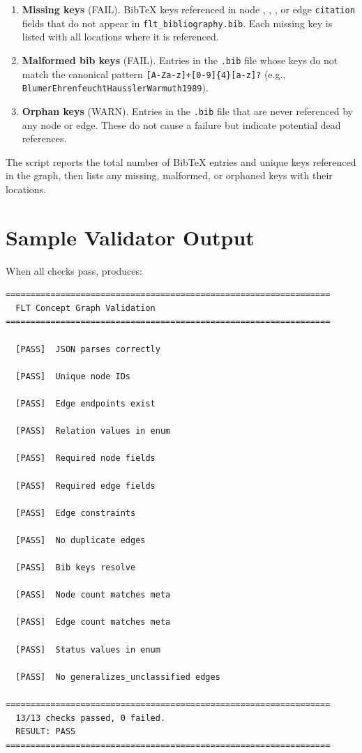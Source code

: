 \begin{enumerate}[leftmargin=2em]
\item \textbf{Missing keys} (FAIL).  BibTeX keys referenced in node , , , or edge \texttt{citation} fields that do not appear in \texttt{flt\_bibliography.bib}.  Each missing key is listed with all locations where it is referenced.

\item \textbf{Malformed bib keys} (FAIL).  Entries in the \texttt{.bib} file whose keys do not match the canonical pattern \texttt{[A-Za-z]+[0-9]\{4\}[a-z]?} (e.g., \texttt{BlumerEhrenfeuchtHausslerWarmuth1989}).

\item \textbf{Orphan keys} (WARN).  Entries in the \texttt{.bib} file that are never referenced by any node or edge.  These do not cause a failure but indicate potential dead references.
\end{enumerate}

\noindent The script reports the total number of BibTeX entries and unique keys referenced in the graph, then lists any missing, malformed, or orphaned keys with their locations.

\section{Sample Validator Output}
\label{sec:sample-output}

When all checks pass,  produces:

{\small
\begin{verbatim}
=================================================================
  FLT Concept Graph Validation
=================================================================

  [PASS]  JSON parses correctly

  [PASS]  Unique node IDs

  [PASS]  Edge endpoints exist

  [PASS]  Relation values in enum

  [PASS]  Required node fields

  [PASS]  Required edge fields

  [PASS]  Edge constraints

  [PASS]  No duplicate edges

  [PASS]  Bib keys resolve

  [PASS]  Node count matches meta

  [PASS]  Edge count matches meta

  [PASS]  Status values in enum

  [PASS]  No generalizes_unclassified edges

=================================================================
  13/13 checks passed, 0 failed.
  RESULT: PASS
=================================================================
\end{verbatim}
}

